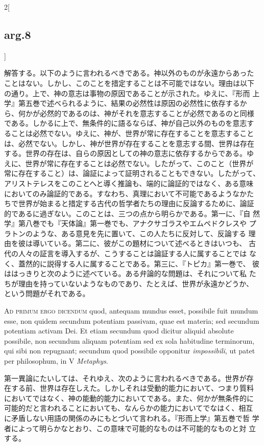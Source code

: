 \documentclass[paper=a4paper,fontsize=10pt,jafontsize=9pt,titlepage]{jlreq}
\begin{document}
\begin{paracol}{2}[\subsection{arg.8}]
\switchcolumn


解答する。以下のように言われるべきである。神以外のものが永遠からあった
ことはない。しかし、このことを措定することは不可能ではない。理由は以下
の通り。上で、神の意志は事物の原因であることが示された。ゆえに、『形而
上学』第五巻で述べられるように、結果の必然性は原因の必然性に依存するか
ら、何かが必然的であるのは、神がそれを意志することが必然であるのと同様
である。しかるに上で、無条件的に語るならば、神が自己以外のものを意志す
ることは必然でない。ゆえに、神が、世界が常に存在することを意志すること
は、必然でない。しかし、神が世界が存在することを意志する間、世界は存在
する。世界の存在は、自らの原因としての神の意志に依存するからである。ゆ
えに、世界が常に存在することは必然でない。したがって、このこと（世界が
常に存在すること）は、論証によって証明されることもできない。したがって、
アリストテレスをこのことへと導く推論も、端的に論証的ではなく、ある意味
においてのみ論証的である。すなわち、真理において不可能であるようなかた
ちで世界が始まると措定する古代の哲学者たちの理由に反論するために、論証
的であるに過ぎない。このことは、三つの点から明らかである。第一に、『自
然学』第八巻でも『天体論』第一巻でも、アナクサゴラスやエムペドクレスや
プラトンのような、ある意見を先に置いて、この人たちに反対して、反論する
理由を彼は導いている。第二に、彼がこの題材について述べるときはいつも、
古代の人々の証言を導入するが、こうすることは論証する人に属することでは
なく、蓋然的に説得する人に属することである。第三に、『トピカ』第一巻で、
彼ははっきりと次のように述べている。ある弁論的な問題は、それについて私
たちが理由を持っていないようなものであり、たとえば、世界が永遠かどうか、
という問題がそれである。


\switchcolumn*[\subsection{ad.1}]


{\scshape Ad primum ergo dicendum} quod, antequam mundus esset, possibile fuit
 mundum esse, non quidem secundum potentiam passivam, quae est materia;
 sed secundum potentiam activam Dei. Et etiam secundum quod dicitur
 aliquid absolute possibile, non secundum aliquam potentiam sed ex sola
 habitudine terminorum, qui sibi non repugnant; secundum quod possibile
 opponitur {\itshape impossibili}, ut patet per philosophum, in V {\itshape Metaphys}.


\switchcolumn


第一異論にたいしては、それゆえ、次のように言われるべきである。世界が存
在する前、世界は存在しえた。しかしそれは受動的能力において、つまり質料
においてではなく、神の能動的能力においてである。また、何かが無条件的に
可能的だと言われることにおいても、なんらかの能力においてでなはく、相互
に矛盾しない用語の関係のみにもとづいて言われる。『形而上学』第五巻で哲
学者によって明らかなとおり、この意味で可能的なものは不可能的なものと対
立する。



\end{paracol}
\end{document}
